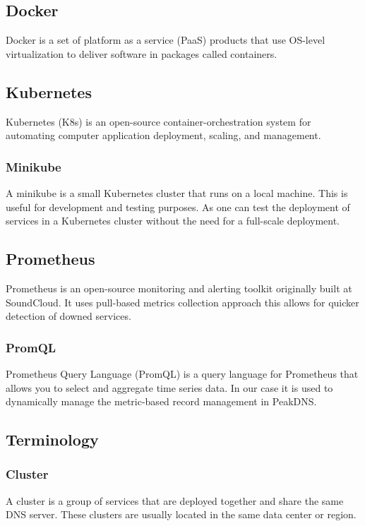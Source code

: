 \documentclass[12pt]{article}
\begin{document}
\subsection{Docker}
Docker\cite{DockerAcceleratedContainer2022} is a set of platform as a service (PaaS) products that use OS-level virtualization to deliver software in packages called containers.

\subsection{Kubernetes}
Kubernetes (K8s)\cite{ProductionGradeContainerOrchestration} is an open-source container-orchestration system for automating computer application deployment, scaling, and management.

\subsubsection{Minikube}
A minikube is a small Kubernetes cluster that runs on a local machine. This is useful for development and testing purposes.
As one can test the deployment of services in a Kubernetes cluster without the need for a full-scale deployment.

\subsection{Prometheus}
Prometheus is an open-source monitoring and alerting toolkit originally built at SoundCloud.
It uses pull-based metrics collection approach this allows for quicker detection of downed services.

\subsubsection{PromQL}
Prometheus Query Language (PromQL) is a query language for Prometheus that allows you to select and aggregate time series data.
In our case it is used to dynamically manage the metric-based record management in PeakDNS.

\subsection{Terminology}
\subsubsection{Cluster}
    A cluster is a group of services that are deployed together and share the same DNS server.
    These clusters are usually located in the same data center or region.
\end{document}
